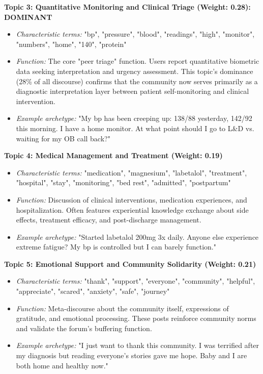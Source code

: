 \documentclass[12pt, a4paper]{article}
\begin{document}
\textbf{Topic 3: Quantitative Monitoring and Clinical Triage (Weight: 0.28): DOMINANT}
\begin{itemize}
    \item \textit{Characteristic terms:} "bp", "pressure", "blood", "readings", "high", "monitor", "numbers", "home", "140", "protein"
    \item \textit{Function:} The core "peer triage" function. Users report quantitative biometric data seeking interpretation and urgency assessment. This topic's dominance (28\% of all discourse) confirms that the community now serves primarily as a diagnostic interpretation layer between patient self-monitoring and clinical intervention.
    \item \textit{Example archetype:} "My bp has been creeping up: 138/88 yesterday, 142/92 this morning. I have a home monitor. At what point should I go to L\&D vs. waiting for my OB call back?"
\end{itemize}

\textbf{Topic 4: Medical Management and Treatment (Weight: 0.19)}
\begin{itemize}
    \item \textit{Characteristic terms:} "medication", "magnesium", "labetalol", "treatment", "hospital", "stay", "monitoring", "bed rest", "admitted", "postpartum"
    \item \textit{Function:} Discussion of clinical interventions, medication experiences, and hospitalization. Often features experiential knowledge exchange about side effects, treatment efficacy, and post-discharge management.
    \item \textit{Example archetype:} "Started labetalol 200mg 3x daily. Anyone else experience extreme fatigue? My bp is controlled but I can barely function."
\end{itemize}

\textbf{Topic 5: Emotional Support and Community Solidarity (Weight: 0.21)}
\begin{itemize}
    \item \textit{Characteristic terms:} "thank", "support", "everyone", "community", "helpful", "appreciate", "scared", "anxiety", "safe", "journey"
    \item \textit{Function:} Meta-discourse about the community itself, expressions of gratitude, and emotional processing. These posts reinforce community norms and validate the forum's buffering function.
    \item \textit{Example archetype:} "I just want to thank this community. I was terrified after my diagnosis but reading everyone's stories gave me hope. Baby and I are both home and healthy now."
\end{itemize}
\end{document}

